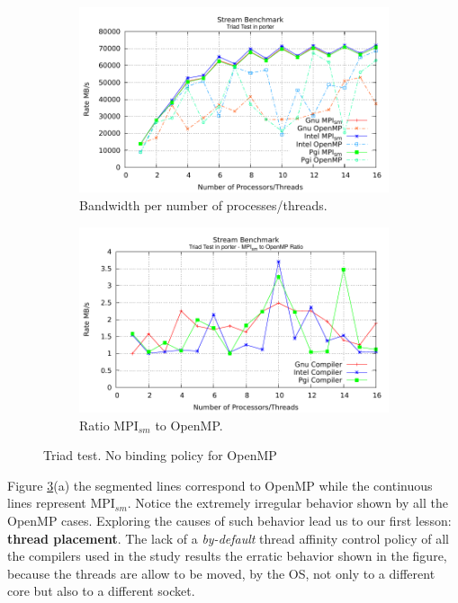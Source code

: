 \begin{figure} [h!]
    \centering
    \captionsetup{justification=centering, singlelinecheck=false}
    \begin{subfigure}{.6\textwidth}
      \hspace*{-1.5cm} 
      \includegraphics[width=0.95\linewidth]{Plots/streamBenchmark/porter-TriadBefore.pdf}
      \caption[]{Bandwidth per number of processes/threads.}
      \label{fig:TriadBefore}
    \end{subfigure}%
    \begin{subfigure}{.6\textwidth}
      \hspace*{-1.5cm} 
      \includegraphics[width=0.95\linewidth]{Plots/streamBenchmark/porter-TriadRatioBefore.pdf}
      \caption{Ratio MPI$_{sm}$ to OpenMP.}
      \label{fig:TriadRatioBefore}
    \end{subfigure}
    \caption{Triad test. No binding policy for OpenMP}
\label{fig:TriadTestBefore}
\end{figure}


Figure \ref{fig:TriadTestBefore}(a) the segmented lines correspond to OpenMP while the continuous lines represent MPI$_{sm}$. Notice the extremely irregular behavior shown by all the OpenMP cases. Exploring the causes of such behavior lead us to our first lesson: \textbf{thread placement}. The lack of a \emph{by-default} thread affinity control policy of all the compilers used in the study results the erratic behavior shown in the figure, because the threads are allow to be moved, by the OS, not only to a different core but also to a different socket.

